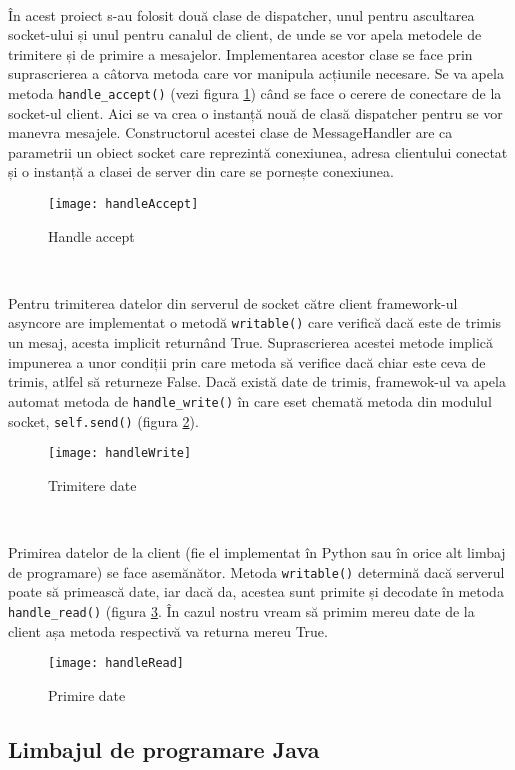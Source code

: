 \documentclass[../IoMusT.tex]{subfiles}
\begin{document}
\\
\par În acest proiect s-au folosit două clase de dispatcher, unul pentru ascultarea socket-ului și unul pentru canalul de client, de unde se vor apela metodele de trimitere și de primire a mesajelor. Implementarea acestor clase se face prin suprascrierea a câtorva metoda care vor manipula acțiunile necesare. Se va apela metoda \verb|handle_accept()| (vezi figura \ref{fig:accept}) când se face o cerere de conectare de la socket-ul client. Aici se va crea o instanță nouă de clasă dispatcher pentru se vor manevra mesajele. Constructorul acestei clase de MessageHandler are ca parametrii un obiect socket care reprezintă conexiunea, adresa clientului conectat și o instanță a clasei de server din care se pornește conexiunea.
\begin{figure}[h]
\centering
\texttt{[image: handleAccept]}
\caption{Handle accept}
\label{fig:accept}
\end{figure}
\\
\par Pentru trimiterea datelor din serverul de socket către client framework-ul asyncore are implementat o metodă \verb|writable()| care verifică dacă este de trimis un mesaj, acesta implicit returnând True. Suprascrierea acestei metode implică impunerea a unor condiții prin care metoda să verifice dacă chiar este ceva de trimis, atlfel să returneze False. Dacă există date de trimis, framewok-ul va apela automat metoda de \verb|handle_write()| în care eset chemată metoda din modulul socket, \verb|self.send()| (figura \ref{fig:write}).
\begin{figure}[h]
\centering
\texttt{[image: handleWrite]}
\caption{Trimitere date}
\label{fig:write}
\end{figure}
\\
\par Primirea datelor de la client (fie el implementat în Python sau în orice alt limbaj de programare) se face asemănător. Metoda \verb|writable()| determină dacă serverul poate să primească date, iar dacă da, acestea sunt primite și decodate în metoda \verb|handle_read()| (figura \ref{fig:read}. În cazul nostru vream să primim mereu date de la client așa metoda respectivă va returna mereu True.
\begin{figure}[h]
\centering
\texttt{[image: handleRead]}
\caption{Primire date}
\label{fig:read}
\end{figure}

\subsection{Limbajul de programare Java}
\end{document}
